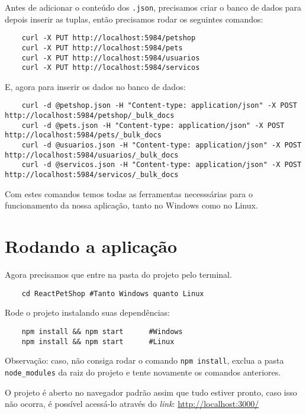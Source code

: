 Antes de adicionar o conteúdo dos \texttt{.json}, precisamos criar o banco de dados para depois inserir as tuplas, então precisamos rodar os seguintes comandos:

\begin{verbatim}
	curl -X PUT http://localhost:5984/petshop
	curl -X PUT http://localhost:5984/pets
	curl -X PUT http://localhost:5984/usuarios
	curl -X PUT http://localhost:5984/servicos
\end{verbatim}

E, agora para inserir os dados no banco de dados:

\begin{verbatim}
	curl -d @petshop.json -H "Content-type: application/json" -X POST http://localhost:5984/petshop/_bulk_docs
	curl -d @pets.json -H "Content-type: application/json" -X POST http://localhost:5984/pets/_bulk_docs
	curl -d @usuarios.json -H "Content-type: application/json" -X POST http://localhost:5984/usuarios/_bulk_docs
	curl -d @servicos.json -H "Content-type: application/json" -X POST http://localhost:5984/servicos/_bulk_docs
\end{verbatim}

Com estes comandos temos todas as ferramentas necesssárias para o funcionamento
da nossa aplicação, tanto no Windows como no Linux.

\section{Rodando a aplicação}
Agora precisamos que entre na pasta do projeto pelo terminal.

\begin{verbatim}
	cd ReactPetShop #Tanto Windows quanto Linux
\end{verbatim}

Rode o projeto instalando suas dependências:

\begin{verbatim}
	npm install && npm start      #Windows
	npm install && npm start      #Linux
\end{verbatim}

Observação: caso, não consiga rodar o comando \texttt{npm install}, exclua a pasta \texttt{node\_modules} da raiz do projeto e tente novamente os comandos anteriores.

O projeto é aberto no navegador padrão assim que tudo estiver pronto, caso isso
não ocorra, é possível acessá-lo através do \emph{link}:
\href{http://localhost:3000/}{http://localhost:3000/}


























